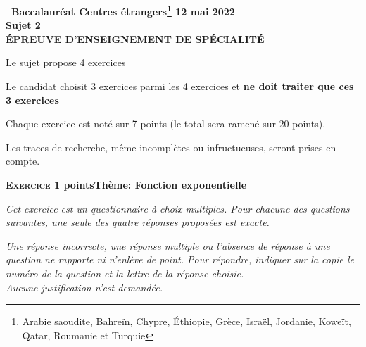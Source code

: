 \documentclass[10pt,a4paper]{article}
\begin{document}
\begin{center}{\Large\textbf{\decofourleft~Baccalauréat Centres étrangers\footnote{Arabie saoudite, Bahreïn, Chypre, Éthiopie, Grèce, Israël, Jordanie, Koweït, Qatar, Roumanie et Turquie} 12 mai 2022~\decofourright\\[7pt]  Sujet 2\\[7pt] ÉPREUVE D'ENSEIGNEMENT DE SPÉCIALITÉ}}
\end{center}

\vspace{0,25cm}

Le sujet propose 4 exercices

Le candidat choisit 3 exercices parmi les 4 exercices et \textbf{ne doit traiter que ces 3 exercices}

Chaque exercice est noté sur 7 points (le total sera ramené sur 20 points).

Les traces de recherche, même incomplètes ou infructueuses, seront prises en compte.

\bigskip

\textbf{\textsc{Exercice 1}  points\hfill Thème: Fonction exponentielle }

\medskip

\emph{Cet exercice est un questionnaire à choix multiples. Pour chacune des questions suivantes, une seule des quatre réponses proposées est exacte.}

\medskip

\emph{Une réponse incorrecte, une réponse multiple ou l'absence de réponse à une question ne rapporte ni n'enlève de point. Pour répondre, indiquer sur la copie le numéro de la question et la lettre de la réponse choisie.\\
Aucune justification n'est demandée.}

\medskip
\end{document}
